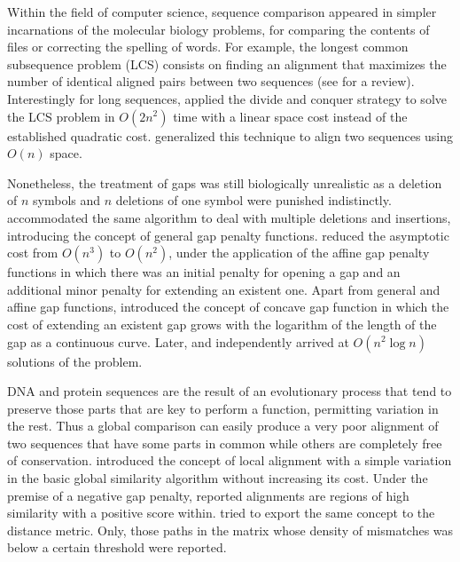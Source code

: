 Within the field of computer science, sequence comparison appeared in simpler incarnations of the 
molecular biology problems, for comparing the contents of files or correcting the spelling of words. For example, 
the longest common subsequence problem (LCS) consists on finding an alignment that maximizes the number of
identical aligned pairs between two sequences (see \citet{apostolico:1987a} for a review).
Interestingly for long sequences, \citet{hirschberg:1975a} applied the divide and conquer strategy to 
solve the LCS problem in $O(2 n^2)$ time with a linear space cost instead of the established quadratic cost.
\citet{myers:1988a} generalized this technique to align two sequences using $O(n)$ space.

Nonetheless, the treatment of gaps was still biologically unrealistic as a deletion of $n$ symbols and $n$ 
deletions of one symbol were punished indistinctly. \citet{waterman:1976a} accommodated the same 
algorithm to deal with multiple deletions and insertions, introducing the concept of general gap 
penalty functions. \citet{gotoh:1982a} reduced the asymptotic cost from $O(n^3)$ to $O(n^2)$, under the
application of the affine gap penalty functions in which there was an initial penalty for opening a gap 
and an additional minor penalty for extending an existent one. Apart from general and affine gap functions, 
\citet{waterman:1984a} introduced the concept of concave gap function in which the cost of extending an 
existent gap grows with the logarithm of the length of the gap as a continuous curve. Later, \citet{eppstein:1988a} 
and \citet{miller:1988a} independently arrived at $O(n^2 \log{n})$ solutions of the problem.

DNA and protein sequences are the result of an evolutionary process that tend to preserve those
parts that are key to perform a function, permitting variation in the rest. Thus a global comparison
can easily produce a very poor alignment of two sequences that have some parts in common while others
are completely free of conservation. \citet{smith:1981c} introduced the concept of local alignment
with a simple variation in the basic global similarity algorithm without increasing its cost. Under the 
premise of a negative gap penalty, reported alignments are regions of high similarity with a positive 
score within. \citet{sellers:1984a} tried to export the same concept to the distance metric. Only, those 
paths in the matrix whose density of mismatches was below a certain threshold were reported.

